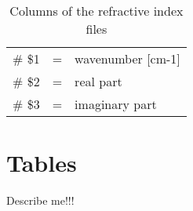 \begin{table*}[!h]
\caption{Columns of the refractive index files}
\begin{tabular}{lcl}
\# \$1 & = & wavenumber [cm-1] \\
\# \$2 & = & real part \\
\# \$3 & = & imaginary part \\
\end{tabular}
\label{tab:Refrac}
\end{table*} 


\section{Tables}
\label{sec:Tables}
\todo Describe me!!!

